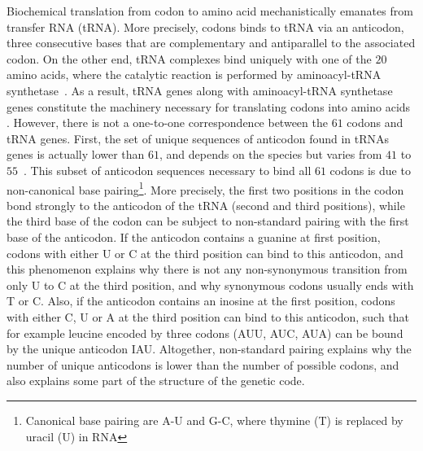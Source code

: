 Biochemical translation from codon to amino acid mechanistically emanates from transfer \acrshort{RNA} (\acrshort{tRNA}).
More precisely, codons binds to \acrshort{tRNA} via an anticodon, three consecutive bases that are complementary and antiparallel to the associated codon.
On the other end, \acrshort{tRNA} complexes bind uniquely with one of the $20$ amino acids, where the catalytic reaction is performed by aminoacyl-tRNA synthetase~\citep{Rich1976}.
As a result, \acrshort{tRNA} genes along with aminoacyl-tRNA synthetase genes constitute the machinery necessary for translating codons into amino acids .
However, there is not a one-to-one correspondence between the $61$ codons and \acrshort{tRNA} genes.
First, the set of unique sequences of anticodon found in tRNAs genes is actually lower than $61$, and depends on the species but varies from $41$ to $55$~\citep{Goodenbour2006}.
This subset of anticodon sequences necessary to bind all $61$ codons is due to non-canonical base pairing\footnote{Canonical base pairing are A-U and G-C, where thymine (T) is replaced by uracil (U) in RNA}.
More precisely, the first two positions in the codon bond strongly to the anticodon of the \acrshort{tRNA} (second and third positions), while the third base of the codon can be subject to non-standard pairing with the first base of the anticodon.
If the anticodon contains a guanine at first position, codons with either U or C at the third position can bind to this anticodon, and this phenomenon explains why there is not any non-synonymous {transition} from only U to C at the third position, and why synonymous codons usually ends with T or C.
Also, if the anticodon contains an inosine at the first position, codons with either C, U or A at the third position can bind to this anticodon, such that for example leucine encoded by three codons (AUU, AUC, AUA) can be bound by the unique anticodon IAU.
Altogether, non-standard pairing explains why the number of unique anticodons is lower than the number of possible codons, and also explains some part of the structure of the genetic code.

